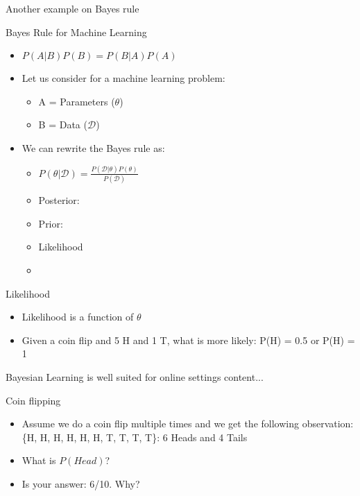 \documentclass[aspectratio=1610]{beamer}
\begin{document}
\begin{frame}{Another example on Bayes rule}
\end{frame}


\begin{frame}{Bayes Rule for Machine Learning}
\begin{itemize}


    \item $P(A|B)P(B) = P(B|A)P(A)$
    \item Let us consider for a machine learning problem:
    \begin{itemize}
    	\item A = Parameters ($\theta$)
    	\item B = Data ($\mathcal{D}$)
    \end{itemize}
\item We can rewrite the Bayes rule as:
\begin{itemize}
	\item $P(\theta|\mathcal{D}) = \frac{P(\mathcal{D}|\theta)P(\theta)}{P(\mathcal{D})}$
	\item Posterior: 
	\item Prior:
	\item Likelihood
	\item 
\end{itemize}
\end{itemize}
\end{frame}

\begin{frame}{Likelihood}
\begin{itemize}
	\item Likelihood is a function of $\theta$
	\item Given a coin flip and 5 H and 1 T, what is more likely: P(H) = 0.5 or P(H) = 1
\end{itemize}
\end{frame}

\begin{frame}{Bayesian Learning is well suited for online settings}
content...
\end{frame}

\begin{frame}{Coin flipping}
\begin{itemize}
	\item Assume we do a coin flip multiple times and we get the following observation: \{H, H, H, H, H, H, T, T, T, T\}: 6 Heads and 4 Tails
	\item  What is $P(Head)$?
	\item Is your answer: 6/10. Why?
\end{itemize}

\end{frame}
\end{document}
